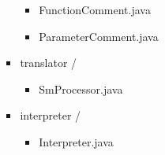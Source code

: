 \begin{itemize}
\begin{itemize}
\begin{itemize}
\begin{itemize}
			       	    	\item FunctionComment.java
			       	    	\item ParameterComment.java
			       	    \end{itemize}
			       	  \item translator /
			       	     	\begin{itemize}
			       	     		\item SmProcessor.java			       	     		
			       	     	\end{itemize}
			       	  \item interpreter /
				       	  \begin{itemize}
				       	  	\item Interpreter.java			       	     		
				       	  \end{itemize}
			      \end{itemize}    
			 \end{itemize}
			      	
	       	
\end{itemize}